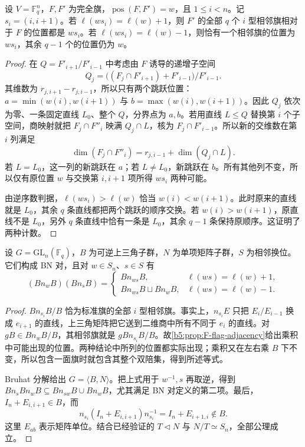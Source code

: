 \begin{proposition}\label{b5:prop:F-flag-adjacency}
	设 \(V=\mathbb F_q^n\)，\(F,F'\) 为完全旗，\(\operatorname{pos}(F,F')=w\)，且 \(1\le i<n\)。记 \(s_i=(i,i+1)\)。若 \(\ell(ws_i)=\ell(w)+1\)，则 \(F'\) 的全部 \(q\) 个 \(i\) 型相邻旗相对于 \(F\) 的位置都是 \(ws_i\)。若 \(\ell(ws_i)=\ell(w)-1\)，则恰有一个相邻旗的位置为 \(ws_i\)，其余 \(q-1\) 个的位置仍为 \(w\)。
\end{proposition}
\begin{proof}
	在 \(Q=F'_{i+1}/F'_{i-1}\) 中考虑由 \(F\) 诱导的递增子空间
	\[
		Q_j=\bigl((F_j\cap F'_{i+1})+F'_{i-1}\bigr)/F'_{i-1}.
	\]
	其维数为 \(r_{j,i+1}-r_{j,i-1}\)，所以只有两个跳跃位置：\(a=\min(w(i),w(i+1))\) 与 \(b=\max(w(i),w(i+1))\)。因此 \(Q_j\) 依次为零、一条固定直线 \(L_0\)、整个 \(Q\)，分界点为 \(a,b\)。若用直线 \(L\le Q\) 替换第 \(i\) 个子空间，商映射就把 \(F_j\cap F''_i\) 映满 \(Q_j\cap L\)，核为 \(F_j\cap F'_{i-1}\)。所以新的交维数在第 \(i\) 列满足
	\[
		\dim(F_j\cap F''_i)=r_{j,i-1}+\dim(Q_j\cap L).
	\]
	若 \(L=L_0\)，这一列的新跳跃在 \(a\)；若 \(L\ne L_0\)，新跳跃在 \(b\)。所有其他列不变，所以仅有原位置 \(w\) 与交换第 \(i,i+1\) 项所得 \(ws_i\) 两种可能。

	由逆序数判据，\(\ell(ws_i)>\ell(w)\) 恰当 \(w(i)<w(i+1)\)。此时原来的直线就是 \(L_0\)，其余 \(q\) 条直线都把两个跳跃的顺序交换。若 \(w(i)>w(i+1)\)，原直线不是 \(L_0\)，另外 \(q\) 条直线中恰有一条是 \(L_0\)，其余 \(q-1\) 条保持原顺序。这证明了两种计数。
\end{proof}

\begin{corollary}\label{b5:cor:F-GL-BN}
	设 \(G=\mathrm{GL}_n(\mathbb F_q)\)，\(B\) 为可逆上三角子群，\(N\) 为单项矩阵子群，\(S\) 为相邻换位。它们构成 BN 对，且对 \(w\in S_n\)、\(s\in S\) 有
	\[
		(Bn_wB)(Bn_sB)=
		\begin{cases}
			Bn_{ws}B,&\ell(ws)=\ell(w)+1,\\
			Bn_{ws}B\sqcup Bn_wB,&\ell(ws)=\ell(w)-1.
		\end{cases}
	\]
\end{corollary}
\begin{proof}
	\(Bn_{s_i}B/B\) 恰为标准旗的全部 \(i\) 型相邻旗。事实上，\(n_{s_i}E\) 只把 \(E_i/E_{i-1}\) 换成 \(e_{i+1}\) 的直线，上三角矩阵把它送到二维商中所有不同于 \(e_i\) 的直线。对 \(gB\in Bn_wB/B\)，其相邻旗就是 \(gBn_{s_i}B/B\)。故\cref{b5:prop:F-flag-adjacency}给出乘积中可能出现的位置。两种结论中所列的位置都实际出现；乘积又在左右乘 \(B\) 下不变，所以包含一面旗时就包含其整个双陪集，得到所述等式。

	Bruhat 分解给出 \(G=\langle B,N\rangle\)。把上式用于 \(w^{-1},s\) 再取逆，得到 \(Bn_sBn_wB\subseteq Bn_{sw}B\cup Bn_wB\)，尤其满足 BN 对定义的第二项。最后，\(I_n+E_{i,i+1}\in B\)，而
	\[
		n_{s_i}(I_n+E_{i,i+1})n_{s_i}^{-1}=I_n+E_{i+1,i}\notin B.
	\]
	这里 \(E_{ab}\) 表示矩阵单位。结合已经验证的 \(T\triangleleft N\) 与 \(N/T\simeq S_n\)，全部公理成立。
\end{proof}

